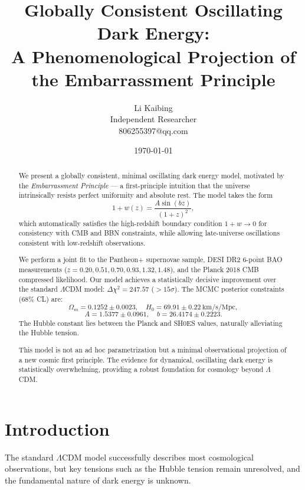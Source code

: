 \documentclass[10pt,twocolumn]{article}
\begin{document}
\title{
Globally Consistent Oscillating Dark Energy: \\
A Phenomenological Projection of the Embarrassment Principle
}

\author{Li Kaibing \\
Independent Researcher \\
806255397@qq.com}

\date{\today}

\maketitle

\begin{abstract}
We present a globally consistent, minimal oscillating dark energy model,
motivated by the \emph{Embarrassment Principle} — a first-principle intuition
that the universe intrinsically resists perfect uniformity and absolute rest.
The model takes the form
\[
1+w(z) = \frac{A\sin(bz)}{(1+z)^2},
\]
which automatically satisfies the high-redshift boundary condition $1+w\to0$
for consistency with CMB and BBN constraints, while allowing
late-universe oscillations consistent with low-redshift observations.

We perform a joint fit to the Pantheon+ supernovae sample,
DESI DR2 6-point BAO measurements ($z=0.20,0.51,0.70,0.93,1.32,1.48$),
and the Planck 2018 CMB compressed likelihood.
Our model achieves a statistically decisive improvement over the standard
$\Lambda$CDM model: $\Delta\chi^2 = 247.57$ ($>15\sigma$).
The MCMC posterior constraints (68\% CL) are:
\[
\Omega_m = 0.1252\pm0.0023,\quad H_0 = 69.91\pm0.22\ \mathrm{km/s/Mpc},
\]
\[
A = 1.5377\pm0.0961,\quad b = 26.4174\pm0.2223.
\]
The Hubble constant lies between the Planck and SH0ES values,
naturally alleviating the Hubble tension.

This model is not an ad hoc parametrization but a minimal observational projection
of a new cosmic first principle. The evidence for dynamical, oscillating dark energy
is statistically overwhelming, providing a robust foundation for cosmology beyond $\Lambda$CDM.
\end{abstract}

\section{Introduction}
The standard $\Lambda$CDM model successfully describes most cosmological
observations, but key tensions such as the Hubble tension remain unresolved,
and the fundamental nature of dark energy is unknown.
\end{document}
